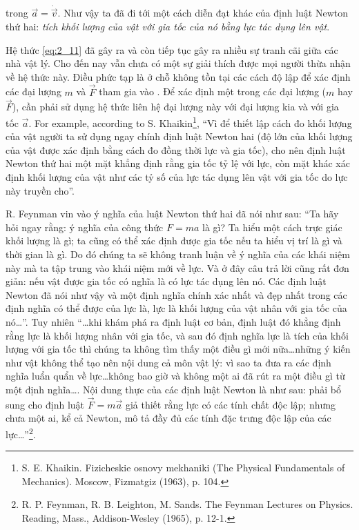\noindent
trong $\vec{a}=\dot{\vec{v}}$. Như vậy ta đã đi tới một cách diễn đạt khác của định luật Newton thứ hai: \textit{tích khối lượng của vật với gia tốc của nó bằng lực tác dụng lên vật}.

Hệ thức \eqref{eq:2_11} đã gây ra và còn tiếp tục gây ra nhiều sự tranh cãi giữa các nhà vật lý. Cho đến nay vẫn chưa có một sự giải thích được mọi người thừa nhận về hệ thức này. Điều phức tạp là ở chỗ không tồn tại các cách độ lập để xác định các đại lượng $m$ và $\vec{F}$ tham gia vào . Để xác định một trong các đại lượng ($m$ hay $\vec{F}$), cần phải sử dụng hệ thức  liên hệ đại lượng này với đại lượng kia và với gia tốc $\vec{a}$. For example, according to S. Khaikin\footnote{S. E. Khaikin. Fizicheskie osnovy mekhaniki (The Physical Fundamentals of Mechanics). Moscow, Fizmatgiz (1963), p. 104.}, ``Vì để thiết lập cách đo khối lượng của vật người ta sử dụng ngay chính định luật Newton hai (độ lớn của khối lượng của vật được xác định bằng cách đo đồng thời lực và gia tốc), cho nên định luật Newton thứ hai một mặt khẳng định rằng gia tốc tỷ lệ với lực, còn mặt khác xác định khối lượng của vật như các tỷ số của lực tác dụng lên vật với gia tốc do lực này truyền cho''.

R. Feynman vin vào ý nghĩa của luật Newton thứ hai đã nói như sau: ``Ta hãy hỏi ngay rằng: ý nghĩa của công thức $F=ma$ là gì? Ta hiểu một cách trực giác khối lượng là gì; ta cũng có thể xác định được gia tốc nếu ta hiểu vị trí là gì và thời gian là gì. Do đó chúng ta sẽ không tranh luận về ý nghĩa của các khái niệm này mà ta tập trung vào khái niệm mới về lực. Và ở đây câu trả lời cũng rất đơn giản: nếu vật được gia tốc có nghĩa là có lực tác dụng lên nó. Các định luật Newton đã nói như vậy và một định nghĩa chính xác nhất và đẹp nhất trong các định nghĩa có thể được của lực là, lực là khối lượng của vật nhân với gia tốc của nó\ldots''. Tuy nhiên ``\ldots khi khám phá ra định luật cơ bản, định luật đó khẳng định rằng lực là khối lượng nhân với gia tốc, và sau đó định nghĩa lực là tích của khối lượng với gia tốc thì chúng ta không tìm thấy một điều gì mới nữa\ldots những ý kiến như vật không thể tạo nên nội dung cả môn vật lý: vì sao ta đưa ra các định nghĩa luẩn quẩn về lực\ldots không bao giờ và không một ai đã rút ra một điều gì từ một định nghĩa\ldots. Nội dung thực của các định luật Newton là như sau: phải bổ sung cho định luật $\vec{F}=m\vec{a}$ giả thiết rằng lực có các tính chất độc lập; nhưng chưa một ai, kể cả Newton, mô tả đầy đủ các tính đặc trưng độc lập của các lực\ldots''\footnote{R. P. Feynman, R. B. Leighton, M. Sands. The Feynman Lectures on Physics. Reading, Mass., Addison-Wesley (1965), p. 12-1.}.

